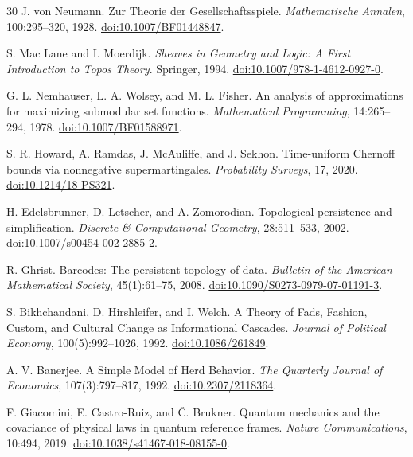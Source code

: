 \documentclass[11pt]{article}
\theoremstyle{definition}
\theoremstyle{plain}
\begin{document}
\begin{thebibliography}{30}
J. von Neumann.
\newblock Zur Theorie der Gesellschaftsspiele.
\newblock \emph{Mathematische Annalen}, 100:295--320, 1928.
\newblock \href{https://doi.org/10.1007/BF01448847}{doi:10.1007/BF01448847}.

S. Mac Lane and I. Moerdijk.
\newblock \emph{Sheaves in Geometry and Logic: A First Introduction to Topos Theory}.
\newblock Springer, 1994.
\newblock \href{https://doi.org/10.1007/978-1-4612-0927-0}{doi:10.1007/978-1-4612-0927-0}.

G. L. Nemhauser, L. A. Wolsey, and M. L. Fisher.
\newblock An analysis of approximations for maximizing submodular set functions.
\newblock \emph{Mathematical Programming}, 14:265--294, 1978.
\newblock \href{https://doi.org/10.1007/BF01588971}{doi:10.1007/BF01588971}.

S. R. Howard, A. Ramdas, J. McAuliffe, and J. Sekhon.
\newblock Time-uniform Chernoff bounds via nonnegative supermartingales.
\newblock \emph{Probability Surveys}, 17, 2020.
\newblock \href{https://doi.org/10.1214/18-PS321}{doi:10.1214/18-PS321}.

H. Edelsbrunner, D. Letscher, and A. Zomorodian.
\newblock Topological persistence and simplification.
\newblock \emph{Discrete \& Computational Geometry}, 28:511--533, 2002.
\newblock \href{https://doi.org/10.1007/s00454-002-2885-2}{doi:10.1007/s00454-002-2885-2}.

R. Ghrist.
\newblock Barcodes: The persistent topology of data.
\newblock \emph{Bulletin of the American Mathematical Society}, 45(1):61--75, 2008.
\newblock \href{https://doi.org/10.1090/S0273-0979-07-01191-3}{doi:10.1090/S0273-0979-07-01191-3}.

S. Bikhchandani, D. Hirshleifer, and I. Welch.
\newblock A Theory of Fads, Fashion, Custom, and Cultural Change as Informational Cascades.
\newblock \emph{Journal of Political Economy}, 100(5):992--1026, 1992.
\newblock \href{https://doi.org/10.1086/261849}{doi:10.1086/261849}.

A. V. Banerjee.
\newblock A Simple Model of Herd Behavior.
\newblock \emph{The Quarterly Journal of Economics}, 107(3):797--817, 1992.
\newblock \href{https://doi.org/10.2307/2118364}{doi:10.2307/2118364}.

F. Giacomini, E. Castro-Ruiz, and \v{C}. Brukner.
\newblock Quantum mechanics and the covariance of physical laws in quantum reference frames.
\newblock \emph{Nature Communications}, 10:494, 2019.
\newblock \href{https://doi.org/10.1038/s41467-018-08155-0}{doi:10.1038/s41467-018-08155-0}.
\end{thebibliography}
\end{document}

